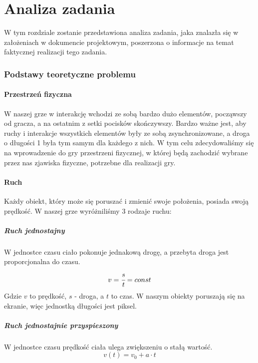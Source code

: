 \newpage
\part{\huge \textbf{Analiza zadania}}
\indent \indent W tym rozdziale zostanie przedstawiona analiza zadania, jaka znalazła się w założeniach w dokumencie projektowym, poszerzona o informacje na temat faktycznej realizacji tego zadania.
\section{Podstawy teoretyczne problemu}
	\subsection{Przestrzeń fizyczna}
	\indent \indent W naszej grze w interakcję wchodzi ze sobą bardzo dużo elementów, począwszy od gracza, a na ostatnim z setki pocisków skończywszy. Bardzo ważne jest, aby ruchy i interakcje wszystkich elementów były ze sobą zsynchronizowane, a droga o długości 1 była tym samym dla każdego z nich. W tym celu zdecydowaliśmy się na wprowadzenie do gry przestrzeni fizycznej, w której będą zachodzić wybrane przez nas zjawiska fizyczne, potrzebne dla realizacji gry.

	\subsection{Ruch}
		\indent \indent Każdy obiekt, który może się poruszać i zmienić swoje położenia, posiada swoją prędkość. W naszej grze wyróżniliśmy 3 rodzaje ruchu:
	\subsubsection{Ruch jednostajny}
		\indent \indent W jednostce czasu ciało pokonuje jednakową drogę, a przebyta droga jest proporcjonalna do czasu.
		$$ v=\cfrac{s}{t}=const$$
		Gdzie $ v $ to prędkość, $ s $ - droga, a $ t $ to czas. W naszym obiekty poruszają się na ekranie, więc jednostką długości jest piksel.
	\subsubsection{Ruch jednostajnie przyspieszony}
		\indent \indent W jednostce czasu prędkość ciała ulega zwiększeniu o stałą wartość.
		$$ v(t)=v_0+a\cdot t $$
